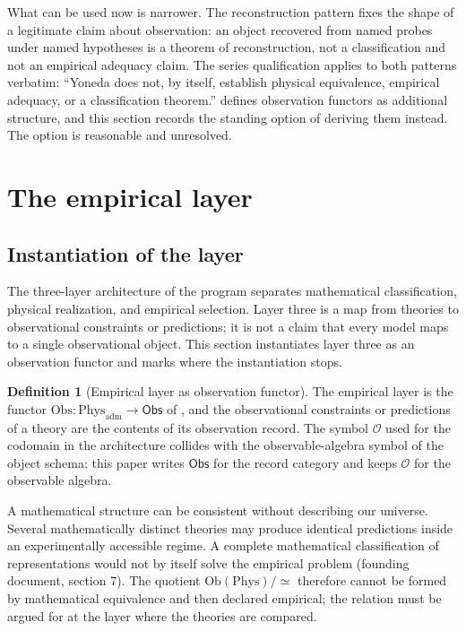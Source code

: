 \documentclass[11pt,letterpaper]{article}
\theoremstyle{definition}
\newtheorem{definition}[theorem]{Definition}
\theoremstyle{remark}
\begin{document}
What can be used now is narrower. The reconstruction pattern fixes the shape of a legitimate claim about observation: an object recovered from named probes under named hypotheses is a theorem of reconstruction, not a classification and not an empirical adequacy claim. The series qualification applies to both patterns verbatim: ``Yoneda does not, by itself, establish physical equivalence, empirical adequacy, or a classification theorem.''  defines observation functors as additional structure, and this section records the standing option of deriving them instead. The option is reasonable and unresolved.

\section{The empirical layer}
\label{sec:empirical}

\subsection{Instantiation of the layer}

The three-layer architecture of the program separates mathematical classification, physical realization, and empirical selection. Layer three is a map from theories to observational constraints or predictions; it is not a claim that every model maps to a single observational object. This section instantiates layer three as an observation functor and marks where the instantiation stops.

\begin{definition}[Empirical layer as observation functor]
\label{def:layer}
The empirical layer is the functor $\mathrm{Obs} \colon \mathrm{Phys}_{\mathrm{adm}} \to \mathsf{Obs}$ of , and the observational constraints or predictions of a theory are the contents of its observation record. The symbol $\mathcal{O}$ used for the codomain in the architecture collides with the observable-algebra symbol of the object schema; this paper writes $\mathsf{Obs}$ for the record category and keeps $\mathcal{O}$ for the observable algebra.
\end{definition}

A mathematical structure can be consistent without describing our universe. Several mathematically distinct theories may produce identical predictions inside an experimentally accessible regime. A complete mathematical classification of representations would not by itself solve the empirical problem (founding document, section 7). The quotient $\mathrm{Ob}(\mathrm{Phys})/{\simeq}$ therefore cannot be formed by mathematical equivalence and then declared empirical; the relation must be argued for at the layer where the theories are compared.
\end{document}
